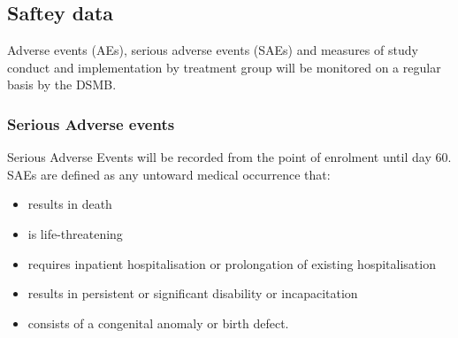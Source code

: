 \documentclass[a4paper]{article}
\begin{document}
\subsection{Saftey data}

Adverse events (AEs), serious adverse events (SAEs) and measures of study conduct and implementation by treatment group will be monitored on a regular basis by the DSMB.

\subsubsection{Serious Adverse events}

Serious Adverse Events will be recorded from the point of enrolment until day 60.
SAEs are defined as any untoward medical occurrence that: 

\begin{itemize}
    \item results in death
    \item is life-threatening
    \item requires inpatient hospitalisation or prolongation of existing hospitalisation
    \item results in persistent or significant disability or incapacitation
    \item consists of a congenital anomaly or birth defect.
\end{itemize}


\end{document}
